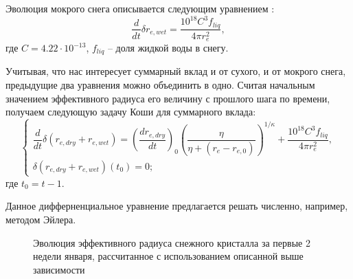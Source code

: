 \documentclass[a4paper, fontsize=14pt]{scrartcl}
\begin{document}
Эволюция мокрого снега описывается следующим уравнением \cite{CLM4.5tech}:
\begin{equation}
\dfrac{d}{dt} \delta r_{e , wet} = \dfrac{10^{18} C^3 f_{liq}} {4 \pi r_{e}^2}, \label{sys}
\end{equation}
где $C = 4.22 \cdot 10^{-13}$, $f_{liq}$ -- доля жидкой воды в снегу.

Учитывая, что нас интересует суммарный вклад и от сухого, и от мокрого снега, предыдущие два уравнения можно объединить в одно. Считая начальным значением эффективного радиуса его величину с прошлого шага по времени, получаем следующую задачу Коши для суммарного вклада:
\begin{equation}
    \begin{cases}
        \dfrac{d}{dt} \delta (r_{e , dry} + r_{e , wet}) = {\left( \dfrac{dr_{e , dry}}{dt} \right)}_0 \left(\dfrac{\eta}{\eta + (r_e - r_{e, 0})}\right)^{1 / \kappa} + \dfrac{10^{18} C^3 f_{liq}} {4 \pi r_{e}^2} ,
        \\
        \delta (r_{e , dry} + r_{e , wet})(t_0) = 0; 
    \end{cases} \label{sysRDS2}
\end{equation}
где $t_0 = t - 1$. 

\newpage
Данное дифферненциальное уравнение предлагается решать численно, например, методом Эйлера.

\begin{figure}[h]
    \caption{Эволюция эффективного радиуса снежного кристалла за первые 2 недели января, рассчитанное с использованием описанной выше зависимости}
    \label{fig:image}
\end{figure}
 
\end{document}
